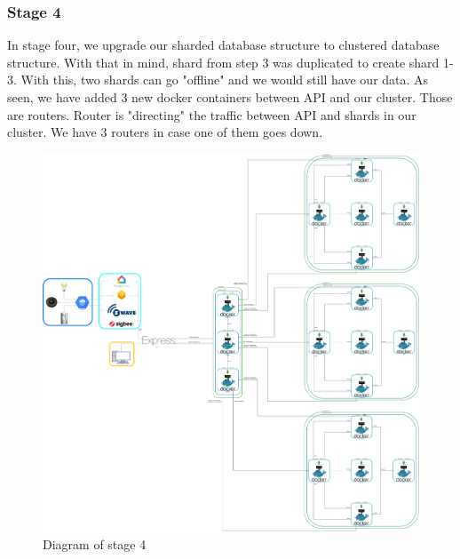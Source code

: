 \subsubsection{Stage 4}
In stage four, we upgrade our sharded database structure to clustered database structure. With that in mind, shard from step 3 was duplicated to create shard 1-3. With this, two shards can go "offline" and we would still have our data. As seen, we have added 3 new docker containers between API and our cluster. Those are routers. Router is "directing" the traffic between API and shards in our cluster. We have 3 routers in case one of them goes down.
\newline
\begin{figure}[H]
\includegraphics[scale=0.07]{img/systemDiagram-clustered.jpg}
\centering
\caption{Diagram of stage 4}
\end{figure}

